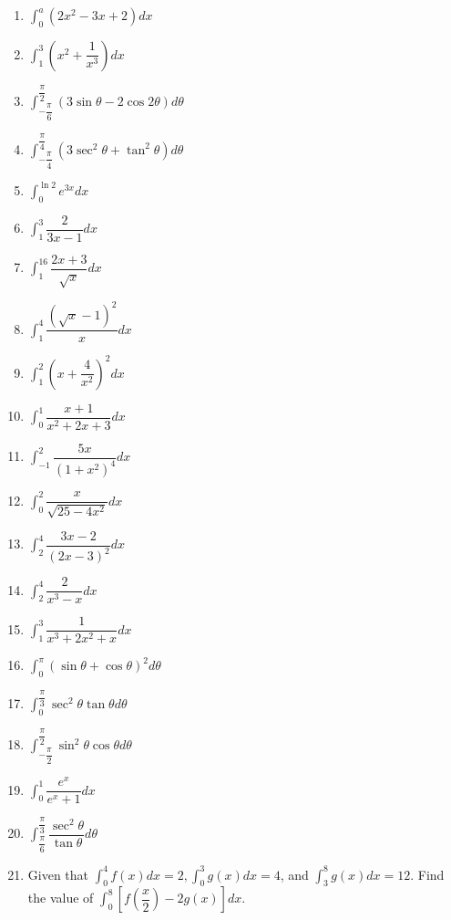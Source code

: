 \documentclass{report}
\begin{document}
\begin{enumerate}
    \item $\displaystyle\int_0^a\left(2 x^2-3 x+2\right) d x$
    \item $\displaystyle\int_1^3\left(x^2+\dfrac{1}{x^3}\right) d x$
    \item $\displaystyle\int_{-\dfrac{\pi}{6}}^{\dfrac{\pi}{2}}(3 \sin \theta-2 \cos 2 \theta) d \theta$
    \item $\displaystyle\int_{-\dfrac{\pi}{4}}^{\dfrac{\pi}{4}}\left(3 \sec ^2 \theta+\tan ^2 \theta\right) d \theta$
    \item $\displaystyle\int_0^{\ln 2} e^{3 x} d x$
    \item $\displaystyle\int_1^3 \dfrac{2}{3 x-1} d x$
    \item $\displaystyle\int_1^{16} \dfrac{2 x+3}{\sqrt{x}} d x$
    \item $\displaystyle\int_1^4 \dfrac{(\sqrt{x}-1)^2}{x} d x$
    \item $\displaystyle\int_1^2\left(x+\dfrac{4}{x^2}\right)^2 d x$
    \item $\displaystyle\int_0^1 \dfrac{x+1}{x^2+2 x+3} d x$
    \item $\displaystyle\int_{-1}^2 \dfrac{5 x}{\left(1+x^2\right)^4} d x$
    \item $\displaystyle\int_0^2 \dfrac{x}{\sqrt{25-4 x^2}} d x$
    \item $\displaystyle\int_2^4 \dfrac{3 x-2}{(2 x-3)^2} d x$
    \item $\displaystyle\int_2^4 \dfrac{2}{x^3-x} d x$
    \item $\displaystyle\int_1^3 \dfrac{1}{x^3+2 x^2+x} d x$
    \item $\displaystyle\int_0^\pi(\sin \theta+\cos \theta)^2 d \theta$
    \item $\displaystyle\int_0^{\dfrac{\pi}{3}} \sec ^2 \theta \tan \theta d \theta$
    \item $\displaystyle\int_{-\dfrac{\pi}{2}}^{\dfrac{\pi}{2}} \sin ^2 \theta \cos \theta d \theta$
    \item $\displaystyle\int_0^1 \dfrac{e^x}{e^x+1} d x$
    \item $\displaystyle\int_{\dfrac{\pi}{6}}^{\dfrac{\pi}{3}} \dfrac{\sec ^2 \theta}{\tan \theta} d \theta$
    \item Given that $\displaystyle\int_0^4 f(x) d x=2, \displaystyle\int_0^3 g(x) d
              x=4$, and $\displaystyle\int_3^8 g(x) d x=12$. Find the value of
          $\displaystyle\int_0^8\left[f\left(\dfrac{x}{2}\right)-2 g(x)\right] d x$.

\end{enumerate}
\end{document}
